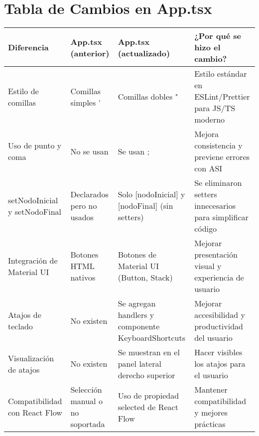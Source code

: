 \documentclass{article}
\begin{document}
\section*{Tabla de Cambios en App.tsx}
\begin{longtable}{|p{3cm}|p{4cm}|p{4cm}|p{4cm}|}
\hline
\textbf{Diferencia} & \textbf{App.tsx (anterior)} & \textbf{App.tsx (actualizado)} & \textbf{¿Por qué se hizo el cambio?} \\
\hline
Estilo de comillas & Comillas simples ' & Comillas dobles " & Estilo estándar en ESLint/Prettier para JS/TS moderno \\
\hline
Uso de punto y coma & No se usan & Se usan ; & Mejora consistencia y previene errores con ASI \\
\hline
setNodoInicial y setNodoFinal & Declarados pero no usados & Solo [nodoInicial] y [nodoFinal] (sin setters) & Se eliminaron setters innecesarios para simplificar código \\
\hline
Integración de Material UI & Botones HTML nativos & Botones de Material UI (Button, Stack) & Mejorar presentación visual y experiencia de usuario \\
\hline
Atajos de teclado & No existen & Se agregan handlers y componente KeyboardShortcuts & Mejorar accesibilidad y productividad del usuario \\
\hline
Visualización de atajos & No existen & Se muestran en el panel lateral derecho superior & Hacer visibles los atajos para el usuario \\
\hline
Compatibilidad con React Flow & Selección manual o no soportada & Uso de propiedad selected de React Flow & Mantener compatibilidad y mejores prácticas \\
\hline
\end{longtable}
\end{document}
